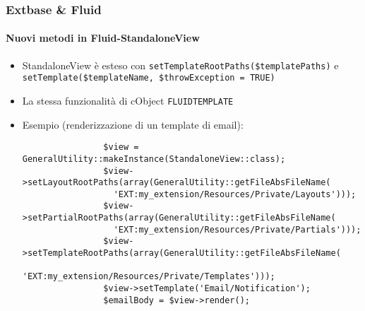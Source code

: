 \begin{frame}[fragile]
	\frametitle{Extbase \& Fluid}
	\framesubtitle{Nuovi metodi in Fluid-StandaloneView}

	\lstset{basicstyle=\tiny\ttfamily}

	\begin{itemize}

		\item StandaloneView è esteso con
			\texttt{setTemplateRootPaths(\$templatePaths)} e
			\texttt{setTemplate(\$templateName, \$throwException = TRUE)}

		\item La stessa funzionalità di cObject \texttt{FLUIDTEMPLATE}

		\item Esempio (renderizzazione di un template di email):

			\begin{lstlisting}
				$view = GeneralUtility::makeInstance(StandaloneView::class);
				$view->setLayoutRootPaths(array(GeneralUtility::getFileAbsFileName(
				  'EXT:my_extension/Resources/Private/Layouts')));
				$view->setPartialRootPaths(array(GeneralUtility::getFileAbsFileName(
				  'EXT:my_extension/Resources/Private/Partials')));
				$view->setTemplateRootPaths(array(GeneralUtility::getFileAbsFileName(
				  'EXT:my_extension/Resources/Private/Templates')));
				$view->setTemplate('Email/Notification');
				$emailBody = $view->render();
			\end{lstlisting}

	\end{itemize}

\end{frame}


